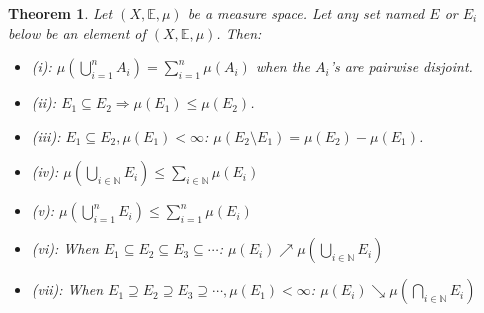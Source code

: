 \documentclass[12pt, a4paper]{article}
\newtheorem{theorem}{Theorem}[section]
\numberwithin{equation}{section}
\begin{document}
\begin{theorem}
\label{measure_properties}
Let $(X, \mathbb{E}, \mu)$ be a measure space. Let any set named $E$ or $E_i$ below be an element of $(X, \mathbb{E}, \mu)$. Then:
\begin{itemize}
\item (i): $\mu\left(\bigcup_{i=1}^n A_i\right)=\sum_{i=1}^n\mu(A_i)$ when the $A_i$'s are pairwise disjoint.
\item (ii): $E_1\subseteq E_2\Rightarrow\mu(E_1)\le\mu(E_2)$.
\item (iii): $E_1\subseteq E_2,\mu(E_1)<\infty$: $\mu(E_2\setminus E_1)=\mu(E_2)-\mu(E_1)$.
\item (iv): $\mu\left(\bigcup_{i\in\mathbb{N}}E_i\right)\le\sum_{i\in\mathbb{N}}\mu(E_i)$
\item (v): $\mu\left(\bigcup_{i=1}^n E_i\right)\le\sum_{i=1}^n\mu(E_i)$
\item (vi): When $E_1\subseteq E_2\subseteq E_3\subseteq\cdots$: $\mu(E_i)\nearrow\mu\left(\bigcup_{i\in\mathbb{N}}E_i\right)$
\item (vii): When $E_1\supseteq E_2\supseteq E_3\supseteq\cdots, \mu(E_1)<\infty$: $\mu(E_i)\searrow\mu\left(\bigcap_{i\in\mathbb{N}}E_i\right)$
\end{itemize}
\end{theorem}
\end{document}
